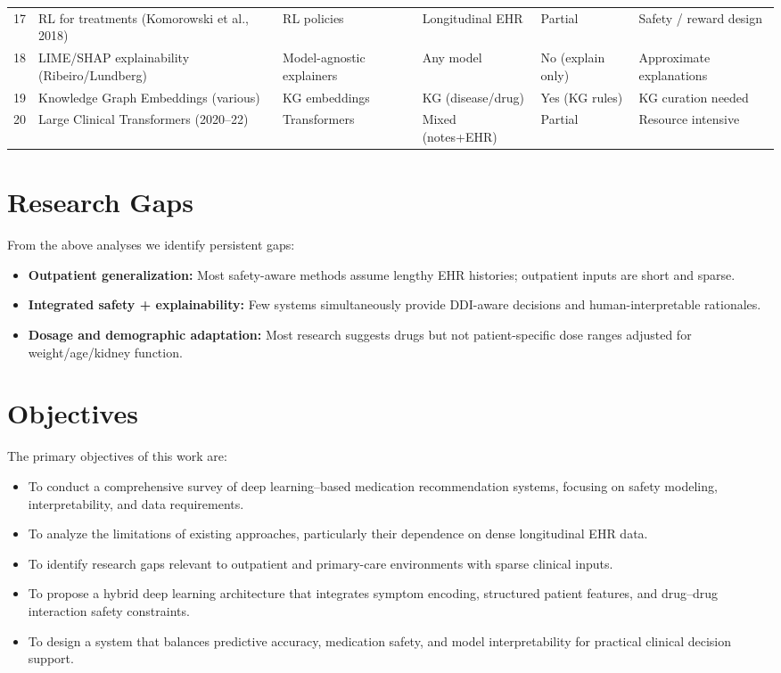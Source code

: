 \documentclass[conference,onecolumn]{IEEEtran}
\begin{document}
\begin{table}[h]
\begin{tabularx}{\textwidth}{@{}l l X X X X@{}}
17 & RL for treatments (Komorowski et al., 2018) & RL policies & Longitudinal EHR & Partial & Safety / reward design \\
18 & LIME/SHAP explainability (Ribeiro/Lundberg) & Model-agnostic explainers & Any model & No (explain only) & Approximate explanations \\
19 & Knowledge Graph Embeddings (various) & KG embeddings & KG (disease/drug) & Yes (KG rules) & KG curation needed \\
20 & Large Clinical Transformers (2020–22) & Transformers & Mixed (notes+EHR) & Partial & Resource intensive \\
\bottomrule
\end{tabularx}
\FloatBarrier
\end{table}



\section{Research Gaps}
From the above analyses we identify persistent gaps:
\begin{itemize}
\item \textbf{Outpatient generalization:} Most safety-aware methods assume lengthy EHR histories; outpatient inputs are short and sparse.
\item \textbf{Integrated safety + explainability:} Few systems simultaneously provide DDI-aware decisions and human-interpretable rationales.
\item \textbf{Dosage and demographic adaptation:} Most research suggests drugs but not patient-specific dose ranges adjusted for weight/age/kidney function.
\end{itemize}

\section{Objectives}

The primary objectives of this work are:

\begin{itemize}
\item To conduct a comprehensive survey of deep learning–based medication recommendation systems, focusing on safety modeling, interpretability, and data requirements.
\item To analyze the limitations of existing approaches, particularly their dependence on dense longitudinal EHR data.
\item To identify research gaps relevant to outpatient and primary-care environments with sparse clinical inputs.
\item To propose a hybrid deep learning architecture that integrates symptom encoding, structured patient features, and drug–drug interaction safety constraints.
\item To design a system that balances predictive accuracy, medication safety, and model interpretability for practical clinical decision support.
\end{itemize}
\end{document}
